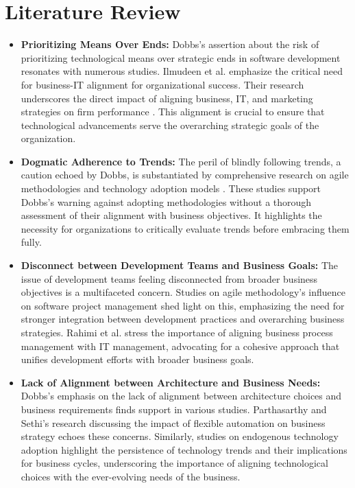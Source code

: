 \documentclass[a4Paper]{article}
\begin{document}
\section{Literature Review}
\begin{itemize}

    \item \textbf{Prioritizing Means Over Ends:} Dobbs's assertion about the risk of prioritizing technological means over strategic ends in software development resonates with numerous studies. Ilmudeen et al. \cite{ilmudeen2019does} emphasize the critical need for business-IT alignment for organizational success. Their research underscores the direct impact of aligning business, IT, and marketing strategies on firm performance \cite{al2020impact}. This alignment is crucial to ensure that technological advancements serve the overarching strategic goals of the organization.
    
    \item \textbf{Dogmatic Adherence to Trends:} The peril of blindly following trends, a caution echoed by Dobbs, is substantiated by comprehensive research on agile methodologies \cite{abrahamsson2017agile} and technology adoption models \cite{dube2020review}. These studies support Dobbs's warning against adopting methodologies without a thorough assessment of their alignment with business objectives. It highlights the necessity for organizations to critically evaluate trends before embracing them fully.
    
    \item \textbf{Disconnect between Development Teams and Business Goals:} The issue of development teams feeling disconnected from broader business objectives is a multifaceted concern. Studies on agile methodology's influence on software project management \cite{hayat2019influence} shed light on this, emphasizing the need for stronger integration between development practices and overarching business strategies. Rahimi et al. \cite{rahimi2016business} stress the importance of aligning business process management with IT management, advocating for a cohesive approach that unifies development efforts with broader business goals.
    
    \item \textbf{Lack of Alignment between Architecture and Business Needs:} Dobbs's emphasis on the lack of alignment between architecture choices and business requirements finds support in various studies. Parthasarthy and Sethi's research \cite{parthasarthy2018impact} discussing the impact of flexible automation on business strategy echoes these concerns. Similarly, studies on endogenous technology adoption \cite{anzoategui2019endogenous} highlight the persistence of technology trends and their implications for business cycles, underscoring the importance of aligning technological choices with the ever-evolving needs of the business.
    

\end{itemize}
\end{document}
